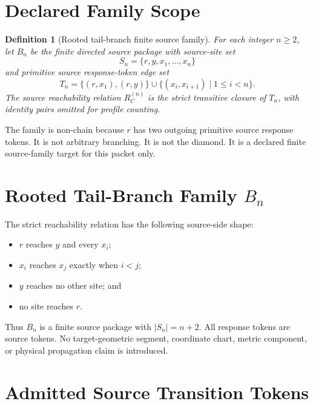 \documentclass[11pt]{article}
\newcommand{\Bn}{B_n}
\newtheorem{definition}{Definition}
\begin{document}
\section{Declared Family Scope}
\label{declared-family-scope}

\begin{definition}[Rooted tail-branch finite source family]
For each integer \(n\ge 2\), let \(\Bn\) be the finite directed source package
with source-site set
\[
S_n=\{r,y,x_1,\ldots,x_n\}
\]
and primitive source response-token edge set
\[
T_n=\{(r,x_1),(r,y)\}\cup \{(x_i,x_{i+1})\mid 1\le i<n\}.
\]
The source reachability relation \(R_C^{(n)}\) is the strict transitive closure
of \(T_n\), with identity pairs omitted for profile counting.
\end{definition}

The family is non-chain because \(r\) has two outgoing primitive source
response tokens. It is not arbitrary branching. It is not the diamond. It is a
declared finite source-family target for this packet only.

\section{Rooted Tail-Branch Family \(B_n\)}
\label{rooted-tail-branch-family}

The strict reachability relation has the following source-side shape:
\begin{itemize}[leftmargin=*]
  \item \(r\) reaches \(y\) and every \(x_i\);
  \item \(x_i\) reaches \(x_j\) exactly when \(i<j\);
  \item \(y\) reaches no other site; and
  \item no site reaches \(r\).
\end{itemize}

Thus \(\Bn\) is a finite source package with \(|S_n|=n+2\). All response tokens
are source tokens. No target-geometric segment, coordinate chart, metric
component, or physical propagation claim is introduced.

\section{Admitted Source Transition Tokens}
\label{admitted-source-transition-tokens}
\end{document}
